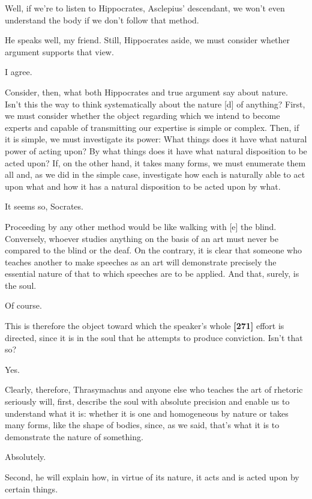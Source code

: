 \sayphaedrus Well, if we're to listen to Hippocrates, Asclepius'
descendant, we won't
even understand the body if we don't follow that method.

\saysocrates He speaks well, my friend. Still, Hippocrates aside, we must
consider whether argument supports that view.

\sayphaedrus I agree.

\saysocrates Consider, then, what both Hippocrates and true argument say
about nature. Isn't this the way to think systematically about the
nature {[}d{]} of anything? First, we must consider whether the object
regarding which we intend to become experts and capable of transmitting
our expertise is simple or complex. Then, if it is simple, we must
investigate its power: What things does it have what natural power of
acting upon? By what things does it have what natural disposition to be
acted upon? If, on the other hand, it takes many forms, we must
enumerate them all and, as we did in the simple case, investigate how
each is naturally able to act upon what and how it has a natural
disposition to be acted upon by what.

\sayphaedrus It seems so, Socrates.

\saysocrates Proceeding by any other method would be like walking with
{[}e{]} the blind. Conversely, whoever studies anything on the basis of
an art must never be compared to the blind or the deaf. On the contrary,
it is clear that someone who teaches another to make speeches as an art
will demonstrate precisely the essential nature of that to which
speeches are to be applied. And that, surely, is the soul.

\sayphaedrus Of course.

\saysocrates This is therefore the object toward which the speaker's whole
{\bf {[}271{]}} effort is directed, since it is in the soul that he
attempts to produce conviction. Isn't that so?

\sayphaedrus Yes.

\saysocrates Clearly, therefore, Thrasymachus and anyone else who teaches
the art of rhetoric seriously will, first, describe the soul with
absolute precision and enable us to understand what it is: whether it is
one and homogeneous by nature or takes many forms, like the shape of
bodies, since, as we said, that's what it is to demonstrate the nature
of something.

\sayphaedrus Absolutely.

\saysocrates Second, he will explain how, in virtue of its nature, it acts
and is acted upon by certain things.

